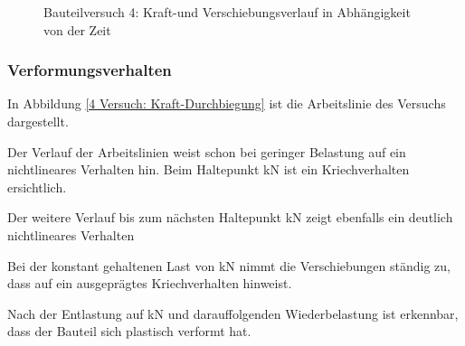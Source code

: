 \begin{figure}[h!]
\begin{center}
\caption{Bauteilversuch 4: Kraft-und Verschiebungsverlauf in Abhängigkeit von der Zeit}
\label{4 Versuch: Kraft-Durchbiegung-Zeit}
\end{center}
\end{figure}


\subsubsection{Verformungsverhalten}

In Abbildung \ref{4 Versuch: Kraft-Durchbiegung} ist die Arbeitslinie des Versuchs dargestellt.


Der Verlauf der Arbeitslinien weist schon bei geringer Belastung auf ein nichtlineares Verhalten hin. Beim Haltepunkt \unit[2,7]{kN} ist ein Kriechverhalten ersichtlich.

Der weitere Verlauf bis zum nächsten Haltepunkt \unit[5,4]{kN} zeigt ebenfalls ein deutlich nichtlineares Verhalten

Bei der konstant gehaltenen Last von \unit[5,4]{kN} nimmt die Verschiebungen ständig zu, dass auf ein ausgeprägtes Kriechverhalten hinweist.


Nach der Entlastung auf \unit[2,7]{kN} und darauffolgenden Wiederbelastung ist erkennbar, dass der Bauteil sich plastisch verformt hat. 






